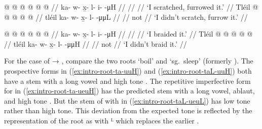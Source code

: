 \begin{multicols}{2}
\pex\label{ex:intro-root-xit}%
\a\label{ex:intro-root-xit-uH}%
\begingl
	\gla	{} @ {} @ {} @ {} @ {} @ {} @ {} //
	\glb	ka- w- x̱- l- i-  -μH //
	\glc	{}\· \· \· \· \·  \· //
	\gld	{} {} {} {} {} {} {} //
	\glft	‘I scratched, furrowed it.’
		//
\endgl
\a\label{ex:intro-root-xit-uuL}%
\begingl
	\gla	Tléil  @ {} @ {} @ {} @ {} @ {} //
	\glb	tléil ka- w- x̱- l-  -μμL //
	\glc	{} \· \· \· \·  \· //
	\gld	not  {} {} {} {} {} //
	\glft	‘I didn’t scratch, furrow it.’
		//
\endgl
\xe

\pex\label{ex:intro-root-sit}%
\a\label{ex:intro-root-sit-uH}%
\begingl
	\gla	{} @ {} @ {} @ {} @ {} @ {} @ {} //
	\glb	ka- w- x̱- l- i-  -μH //
	\glc	{}\· \· \· \· \·  \· //
	\gld	{} {} {} {} {} {} {} //
	\glft	‘I braided it.’
		//
\endgl
\a\label{ex:intro-root-sit-uuH}%
\begingl
	\gla	Tléil  @ {} @ {} @ {} @ {} @ {} //
	\glb	tléil ka- w- x̱- l-  -μμH //
	\glc	{} \· \· \· \·  \· //
	\gld	not  {} {} {} {} {} //
	\glft	‘I didn’t braid it.’
		//
\endgl
\xe
\end{multicols}

For the case of  → , compare the two roots  ‘boil’ and  ‘sg.\ sleep’ (formerly ).
The prospective forms in (\ref{ex:intro-root-ta-uuH}) and (\ref{ex:intro-root-taL-uuH}) both have a stem with a long vowel and high tone .
The repetitive imperfective form for  in (\ref{ex:intro-root-ta-ueuH}) has the predicted stem with a long vowel, ablaut, and high tone .
But the stem of  with  in (\ref{ex:intro-root-taL-ueuL}) has low tone rather than high tone.
This deviation from the expected tone is reflected by the representation of the root as  with ᴸ which replaces the earlier .

